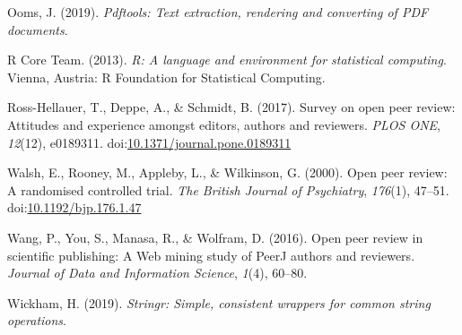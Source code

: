 \documentclass[,jou, a4paper,floatsintext]{apa6}
\begin{document}
\leavevmode\hypertarget{ref-ooms_pdftools_2019}{}%
Ooms, J. (2019). \emph{Pdftools: Text extraction, rendering and converting of PDF documents}.

\leavevmode\hypertarget{ref-r_core_team_r_2013}{}%
R Core Team. (2013). \emph{R: A language and environment for statistical computing}. Vienna, Austria: R Foundation for Statistical Computing.

\leavevmode\hypertarget{ref-ross-hellauer_survey_2017}{}%
Ross-Hellauer, T., Deppe, A., \& Schmidt, B. (2017). Survey on open peer review: Attitudes and experience amongst editors, authors and reviewers. \emph{PLOS ONE}, \emph{12}(12), e0189311. doi:\href{https://doi.org/10.1371/journal.pone.0189311}{10.1371/journal.pone.0189311}

\leavevmode\hypertarget{ref-walsh_open_2000}{}%
Walsh, E., Rooney, M., Appleby, L., \& Wilkinson, G. (2000). Open peer review: A randomised controlled trial. \emph{The British Journal of Psychiatry}, \emph{176}(1), 47--51. doi:\href{https://doi.org/10.1192/bjp.176.1.47}{10.1192/bjp.176.1.47}

\leavevmode\hypertarget{ref-wang_open_2016}{}%
Wang, P., You, S., Manasa, R., \& Wolfram, D. (2016). Open peer review in scientific publishing: A Web mining study of PeerJ authors and reviewers. \emph{Journal of Data and Information Science}, \emph{1}(4), 60--80.

\leavevmode\hypertarget{ref-wickham_stringr_2019}{}%
Wickham, H. (2019). \emph{Stringr: Simple, consistent wrappers for common string operations}.
\end{document}
